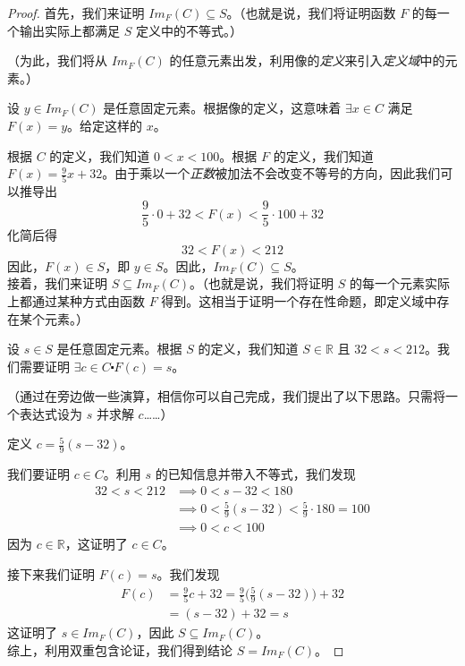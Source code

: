 \begin{example}
    \begin{proof}
        首先，我们来证明 $Im_F (C) \subseteq S$。（也就是说，我们将证明函数 $F$ 的每一个输出实际上都满足 $S$ 定义中的不等式。）

        （为此，我们将从 $Im_F (C)$ 的任意元素出发，利用像的\emph{定义}来引入\emph{定义域}中的元素。）

        设 $y \in Im_F (C)$ 是任意固定元素。根据像的定义，这意味着 $\exists x \in C$ 满足 $F(x) = y$。给定这样的 $x$。

        根据 $C$ 的定义，我们知道 $ 0 < x < 100$。根据 $F$ 的定义，我们知道 $F(x) = \frac{9}{5}x + 32$。由于乘以一个\emph{正数}被加法不会改变不等号的方向，因此我们可以推导出
        \[ \frac{9}{5} \cdot 0 + 32 < F(x) <  \frac{9}{5} \cdot 100 + 32\]
        化简后得
        \[32 < F(x) < 212\]
        因此，$F(x) \in S$，即 $y \in S$。因此，$Im_F (C) \subseteq S$。\\
        
        接着，我们来证明 $S \subseteq Im_F (C)$。（也就是说，我们将证明 $S$ 的每一个元素实际上都通过某种方式由函数 $F$ 得到。这相当于证明一个存在性命题，即定义域中存在某个元素。）

        设 $s \in S$ 是任意固定元素。根据 $S$ 的定义，我们知道 $S \in \mathbb{R}$ 且 $32 < s < 212$。我们需要证明 $\exists c \in C \centerdot F(c) = s$。

        （通过在旁边做一些演算，相信你可以自己完成，我们提出了以下思路。只需将一个表达式设为 $s$ 并求解 $c$……）

        定义 $c = \frac{5}{9}(s-32)$。

        我们要证明 $c \in C$。利用 $s$ 的已知信息并带入不等式，我们发现
        \begin{align*}
            32 < s < 212 &\implies 0 < s - 32 < 180 \\
            &\implies 0 < \frac{5}{9}(s - 32) < \frac{5}{9} \cdot 180 = 100 \\
            &\implies 0 < c < 100
        \end{align*}
        因为 $c \in \mathbb{R}$，这证明了 $c \in C$。

        接下来我们证明 $F(c) = s$。我们发现
        \begin{align*}
            F(c) &= \frac{9}{5}c + 32 = \frac{9}{5}\Big(\frac{5}{9}(s-32)\Big)+32\\
            &= (s - 32) + 32 = s
        \end{align*}
        这证明了 $s \in Im_F (C)$，因此 $S \subseteq Im_F (C)$。\\

        综上，利用双重包含论证，我们得到结论 $S = Im_F (C)$。
    \end{proof}
\end{example}

